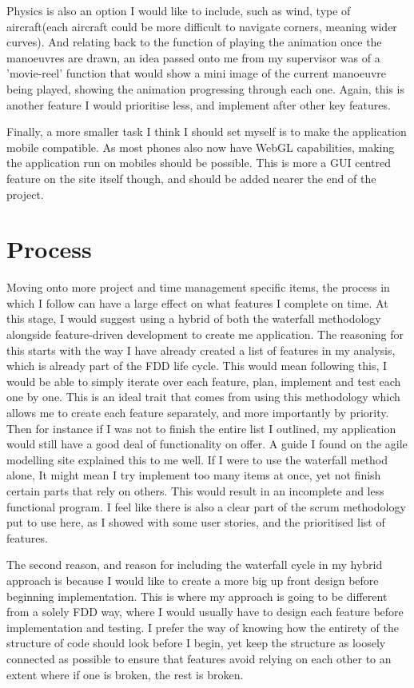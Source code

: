 Physics is also an option I would like to include, such as wind, type of aircraft(each aircraft could be more difficult to navigate corners, meaning wider curves). And relating back to the function of playing the animation once the manoeuvres are drawn, an idea passed onto me from my supervisor was of a 'movie-reel' function that would show a mini image of the current manoeuvre being played, showing the animation progressing through each one. Again, this is another feature I would prioritise less, and implement after other key features.

Finally, a more smaller task I think I should set myself is to make the application mobile compatible. As most phones also now have WebGL capabilities, making the application run on mobiles should be possible. This is more a GUI centred feature on the site itself though, and should be added nearer the end of the project.

\section{Process}
Moving onto more project and time management specific items, the process in which I follow can have a large effect on what features I complete on time. At this stage, I would suggest using a hybrid of both the waterfall methodology alongside feature-driven development to create me application. The reasoning for this starts with the way I have already created a list of features in my analysis, which is already part of the FDD life cycle. This would mean following this, I would be able to simply iterate over each feature, plan, implement and test each one by one. This is an ideal trait that comes from using this methodology which allows me to create each feature separately, and more importantly by priority. Then for instance if I was not to finish the entire list I outlined, my application would still have a good deal of functionality on offer. A guide I found on the agile modelling site\cite{FDD} explained this to me well. If I were to use the waterfall method alone, It might mean I try implement too many items at once, yet not finish certain parts that rely on others. This would result in an incomplete and less functional program. I feel like there is also a clear part of the scrum methodology put to use here, as I showed with some user stories, and the prioritised list of features.

The second reason, and reason for including the waterfall cycle in my hybrid approach is because I would like to create a more big up front design before beginning implementation. This is where my approach is going to be different from a solely FDD way, where I would usually have to design each feature before implementation and testing. I prefer the way of knowing how the entirety of the structure of code should look before I begin, yet keep the structure as loosely connected as possible to ensure that features avoid relying on each other to an extent where if one is broken, the rest is broken. 

